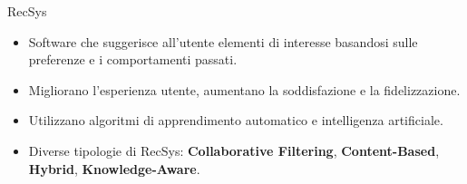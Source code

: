 
\begin{frame}{RecSys}
\begin{itemize}
\item Software che suggerisce all'utente elementi di interesse basandosi sulle preferenze e i comportamenti passati.
    \item Migliorano l'esperienza utente, aumentano la soddisfazione e la fidelizzazione.
    \item Utilizzano algoritmi di apprendimento automatico e intelligenza artificiale.
    \item Diverse tipologie di RecSys: \textbf{Collaborative Filtering}, \textbf{Content-Based}, \textbf{Hybrid}, \textbf{Knowledge-Aware}.
\end{itemize}
\end{frame}

\begin{comment}
\begin{frame}{Valutazione e problemi dei RecSys}
    \begin{block}{Valutazione}   
Per valutare un RecSys si possono usare diverse metriche come il MAE (Mean Absolute Error) che misura la differenza tra il valore predetto e il valore reale, l'NDGC che misura la qualità delle raccomandazioni, la diversity che misura la varietà delle raccomandazioni, la coverage che misura la percentuale di elementi raccomandati, la recall che misura la capacità di un modello di raccomandare gli item rilevanti per un utente
\end{block}
\begin{alertblock}{Problemi}

I RecSys possono presentare problemi di Cold Start, quando non si hanno informazioni sufficienti per fare raccomandazioni, di More of the Same, quando si raccomandano sempre gli stessi elementi, la vulnerabilità agli attacchi (come recensioni false).
\end{alertblock}
\end{frame}
\end{comment}